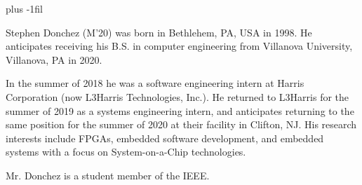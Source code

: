 \documentclass[journal]{IEEEtran}
\begin{document}
\vskip 0pt plus -1fil
\begin{IEEEbiography}
	{Stephen Donchez}
(M'20) was born in Bethlehem, PA, USA in 1998. He anticipates receiving his B.S. in
computer engineering from Villanova University, Villanova, PA in 2020.

In the summer of 2018 he was a software engineering intern at Harris Corporation  
(now L3Harris Technologies, Inc.). He returned to L3Harris for the summer of 2019 as a 
systems engineering intern, and anticipates returning to the same position for the summer
of 2020 at their facility in Clifton, NJ. His research interests include FPGAs, embedded
software development, and embedded systems with a focus on System-on-a-Chip technologies.

Mr. Donchez is a student member of the IEEE.
\end{IEEEbiography}
\end{document}
